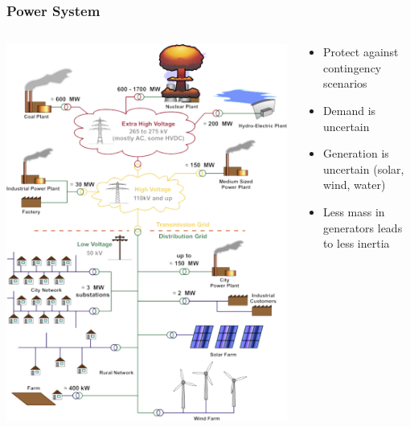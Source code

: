 \begin{frame}
  \frametitle{Power System}
  \begin{columns}
    \begin{column}{0.45\textwidth}
      \includegraphics[width=\textwidth]{figures/slides.png}
    \end{column}
    \begin{column}{0.45\textwidth}
      \begin{center}
      \end{center}
      \begin{itemize}
        \item Protect against contingency scenarios
        \item Demand is uncertain
        \item Generation is uncertain (solar, wind, water)
        \item Less mass in generators leads to less inertia
      \end{itemize}
    \end{column}
  \end{columns}
\end{frame}

